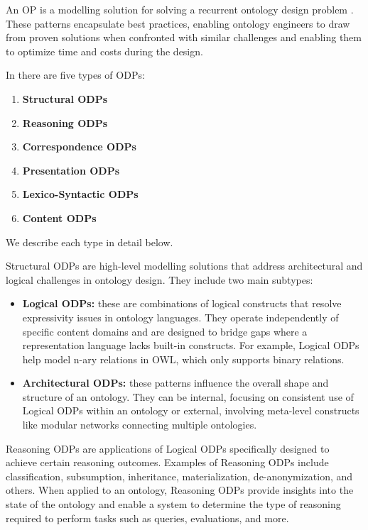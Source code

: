 An OP is a modelling solution for solving a recurrent ontology design problem \cite{gangemi2009ontology}.
These patterns encapsulate best practices, enabling ontology engineers to draw from proven solutions when confronted with similar challenges and enabling them to optimize time and costs during the design. 

In \cite{falbo2013ontology} there are five types of ODPs:
\begin{enumerate}
    \item \textbf{Structural ODPs}

    \item \textbf{Reasoning ODPs}

    \item \textbf{Correspondence ODPs}

    \item \textbf{Presentation ODPs}

    \item \textbf{Lexico-Syntactic ODPs}

    \item \textbf{Content ODPs}
\end{enumerate}
We describe each type in detail below.

Structural ODPs are high-level modelling solutions that address architectural and logical challenges in ontology design.
They include two main subtypes:
\begin{itemize}
    \item \textbf{Logical ODPs:} these are combinations of logical constructs that resolve expressivity issues in ontology languages. They operate independently of specific content domains and are designed to bridge gaps where a representation language lacks built-in constructs. For example, Logical ODPs help model n-ary relations in OWL, which only supports binary relations.

    \item \textbf{Architectural ODPs:} these patterns influence the overall shape and structure of an ontology. They can be internal, focusing on consistent use of Logical ODPs within an ontology or external, involving meta-level constructs like modular networks connecting multiple ontologies.
\end{itemize}

Reasoning ODPs are applications of Logical ODPs specifically designed to achieve certain reasoning outcomes.
Examples of Reasoning ODPs include classification, subsumption, inheritance, materialization, de-anonymization, and others.
When applied to an ontology, Reasoning ODPs provide insights into the state of the ontology and enable a system to determine the type of reasoning required to perform tasks such as queries, evaluations, and more.

